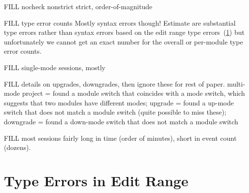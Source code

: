 \documentclass[english,submission,cleveref]{programming}
\begin{document}

FILL nocheck nonstrict strict, order-of-magnitude

FILL type error counts
Mostly syntax errors though!
Estimate  are substantial type errors rather than syntax
errors based on the edit range type errors~(\cref{s:type-error-count})
but unfortunately we cannot get an exact number for the overall
or per-module type error counts.

FILL single-mode sessions, mostly

FILL details on upgrades, downgrades, then ignore these for rest of paper.
multi-mode project = found a module switch that coincides with a mode switch, which suggests that two modules have different modes;
upgrade = found a up-mode switch that does not match a module switch (quite possible to miss these);
downgrade = found a down-mode switch that does not match a module switch

FILL most sessions fairly long in time (order of minutes),
short in event count (dozens).


\section{Type Errors in Edit Range}
\label{s:type-error-count}
\end{document}
